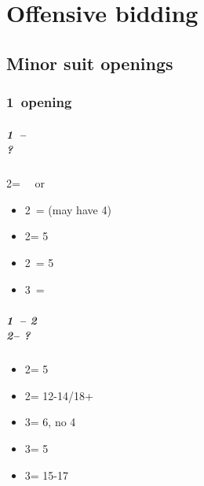 \documentclass[12pt, a4paper]{report}
\begin{document}
\part*{\colorbox{RoyalPurple!30}{Offensive bidding}}
 {

    \chapter*{\colorbox{Plum!30}{Minor suit openings}}
     {

        \section*{\colorbox{blue!30}{1\clubs\ opening}}
         {

            \subsubsection*{1\clubs\ -- \alrts{2\clubs} \\ ?}
            2\clubs = \gf\ \nat\ or \bal
            \begin{itemize}
                \item 2\diams\ = \bal (may have 4\major)
                \item 2\major = 5\major
                \item 2\nt\ = 5\diams
                \item 3\clubs\ = \clubs
            \end{itemize}

            \subsubsection*{1\clubs\ -- 2\clubs \\
                        2\diams -- ?}
            \begin{itemize}
                \item 2\major = 5\major
                \item 2\nt = 12-14/18+ \bal
                \item 3\clubs = 6\clubs, no 4\major
                \item 3\diams = 5\diams
                \item 3\nt = 15-17 \bal
            \end{itemize}
        }

}}
\end{document}

